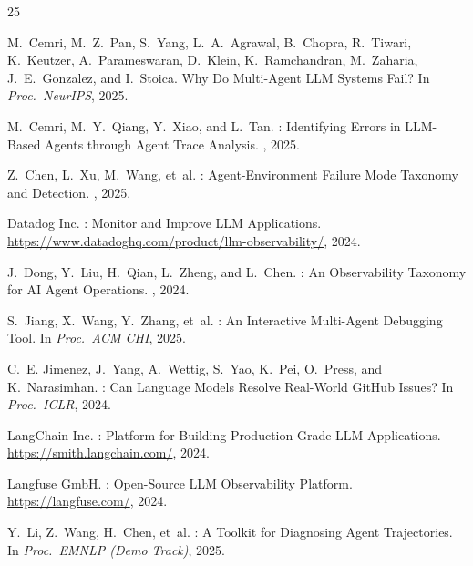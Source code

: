 \documentclass[11pt]{article}
\begin{document}
\begin{thebibliography}{25}

M.~Cemri, M.~Z.~Pan, S.~Yang, L.~A.~Agrawal, B.~Chopra, R.~Tiwari,
  K.~Keutzer, A.~Parameswaran, D.~Klein, K.~Ramchandran, M.~Zaharia,
  J.~E.~Gonzalez, and I.~Stoica.
\newblock Why Do Multi-Agent {LLM} Systems Fail?
\newblock In {\em Proc.\ NeurIPS}, 2025.

M.~Cemri, M.~Y.~Qiang, Y.~Xiao, and L.~Tan.
: Identifying Errors in {LLM}-Based Agents through
  Agent Trace Analysis.
, 2025.

Z.~Chen, L.~Xu, M.~Wang, et~al.
: Agent-Environment Failure Mode Taxonomy and Detection.
, 2025.

{Datadog Inc.}
: Monitor and Improve {LLM} Applications.
\newblock \url{https://www.datadoghq.com/product/llm-observability/}, 2024.

J.~Dong, Y.~Liu, H.~Qian, L.~Zheng, and L.~Chen.
: An Observability Taxonomy for {AI} Agent Operations.
, 2024.

S.~Jiang, X.~Wang, Y.~Zhang, et~al.
: An Interactive Multi-Agent Debugging Tool.
\newblock In {\em Proc.\ ACM CHI}, 2025.

C.~E. Jimenez, J.~Yang, A.~Wettig, S.~Yao, K.~Pei, O.~Press, and
  K.~Narasimhan.
: Can Language Models Resolve Real-World {GitHub} Issues?
\newblock In {\em Proc.\ ICLR}, 2024.

{LangChain Inc.}
: Platform for Building Production-Grade {LLM}
  Applications.
\newblock \url{https://smith.langchain.com/}, 2024.

{Langfuse GmbH}.
: Open-Source {LLM} Observability Platform.
\newblock \url{https://langfuse.com/}, 2024.

Y.~Li, Z.~Wang, H.~Chen, et~al.
: A Toolkit for Diagnosing Agent Trajectories.
\newblock In {\em Proc.\ EMNLP (Demo Track)}, 2025.


\end{thebibliography}
\end{document}
